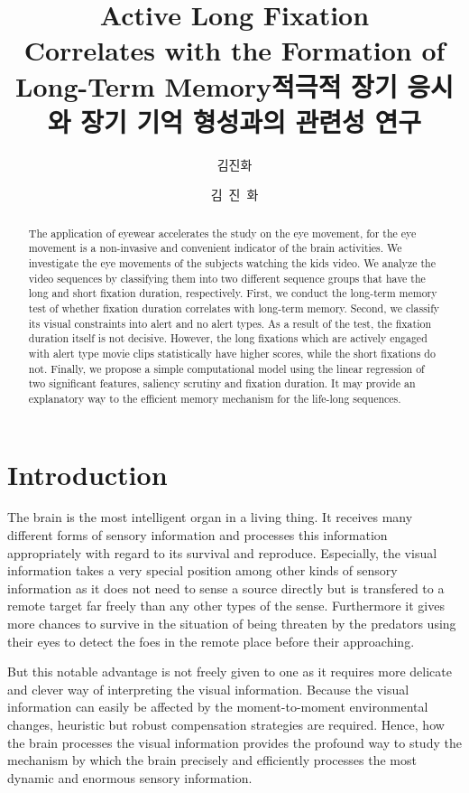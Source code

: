 \documentclass[oneside,master]{snueethesis}
\title{Active Long Fixation \\
Correlates with the Formation of \\
Long-Term Memory}
\title*{적극적 장기 응시와 장기 기억 형성과의 관련성 연구}
\author{김진화}
\author*{김~진~화} %
\begin{document}
\makefrontcover
\makefrontcover
\makeapproval

\cleardoublepage
{}

\begin{abstract}
The application of eyewear accelerates the study on the eye movement, for the eye movement is a non-invasive and convenient indicator of the brain activities. We investigate the eye movements of the subjects watching the kids video. We analyze the video sequences by classifying them into two different sequence groups that have the long and short fixation duration, respectively. First, we conduct the long-term memory test of whether fixation duration correlates with long-term memory. Second, we classify its visual constraints into alert and no alert types. As a result of the test, the fixation duration itself is not decisive. However, the long fixations which are actively engaged with alert type movie clips statistically have higher scores, while the short fixations do not. Finally, we propose a simple computational model using the linear regression of two significant features, saliency scrutiny and fixation duration. It may provide an explanatory way to the efficient memory mechanism for the life-long sequences.


\end{abstract}

\tableofcontents
\listoffigures
\listoftables

\cleardoublepage
{}

\chapter{Introduction}

The brain is the most intelligent organ in a living thing. It receives many different forms of sensory information and processes this information appropriately with regard to its survival and reproduce. Especially, the visual information takes a very special position among other kinds of sensory information as it does not need to sense a source directly but is transfered to a remote target far freely than any other types of the sense. Furthermore it gives more chances to survive in the situation of being threaten by the predators using their eyes to detect the foes in the remote place before their approaching. 

But this notable advantage is not freely given to one as it requires more delicate and clever way of interpreting the visual information. Because the visual information can easily be affected by the moment-to-moment environmental changes, heuristic but robust compensation strategies are required. Hence, how the brain processes the visual information provides the profound way to study the mechanism by which the brain precisely and efficiently processes the most dynamic and enormous sensory information.
\end{document}
